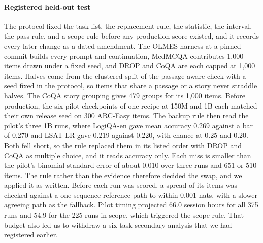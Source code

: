 \paragraph{Registered held-out test}\label{app:heldout}
The protocol fixed the task list, the replacement rule, the statistic, the interval, the pass rule, and a scope rule before any production score existed, and it records every later change as a dated amendment. The OLMES harness at a pinned commit builds every prompt and continuation, MedMCQA contributes 1,000 items drawn under a fixed seed, and DROP and CoQA are each capped at 1,000 items. Halves come from the clustered split of the passage-aware check with a seed fixed in the protocol, so items that share a passage or a story never straddle halves. The CoQA story grouping gives 479 groups for its 1,000 items. Before production, the six pilot checkpoints of one recipe at 150M and 1B each matched their own release seed on 300 ARC-Easy items. The backup rule then read the pilot's three 1B runs, where LogiQA-en gave mean accuracy 0.269 against a bar of 0.270 and LSAT-LR gave 0.219 against 0.220, with chance at 0.25 and 0.20. Both fell short, so the rule replaced them in its listed order with DROP and CoQA as multiple choice, and it reads accuracy only. Each miss is smaller than the pilot's binomial standard error of about 0.010 over three runs and 651 or 510 items. The rule rather than the evidence therefore decided the swap, and we applied it as written. Before each run was scored, a spread of its items was checked against a one-sequence reference path to within 0.001 nats, with a slower agreeing path as the fallback. Pilot timing projected 66.0 session hours for all 375 runs and 54.9 for the 225 runs in scope, which triggered the scope rule. That budget also led us to withdraw a six-task secondary analysis that we had registered earlier.

